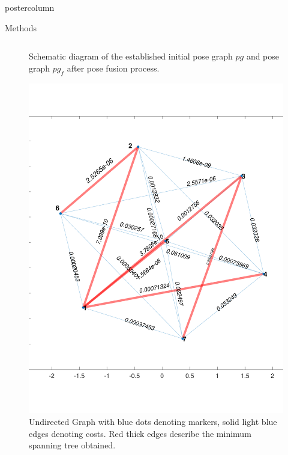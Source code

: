 \documentclass{beamer}
\begin{document}
\begin{frame}
\begin{columns}
\begin{column}{.57\textwidth}
\begin{beamercolorbox}[center]{postercolumn}
\begin{minipage}{.98\textwidth}
{\begin{myblock}{Methods}
\begin{minipage}[0.3\textheight]{\textwidth}
\begin{columns}[T]
\begin{column}{0.5\textwidth}
\begin{figure}
\caption{Schematic diagram of the established initial pose graph $pg$ and pose graph $pg_{f}$ after pose fusion process.}
\label{fig:dt_pg}
\end{figure}
\begin{figure}
\centering
\includegraphics[scale=0.72]{img/graph}
\caption{Undirected Graph with blue dots denoting markers, solid light blue edges denoting costs. Red thick edges describe the minimum spanning tree obtained.}
\label{fig:ugraph}
\end{figure}
\end{column}
\end{columns}
\end{minipage}
\end{myblock}

}
\end{minipage}
\end{beamercolorbox}
\end{column}
\end{columns}
\end{frame}
\end{document}

